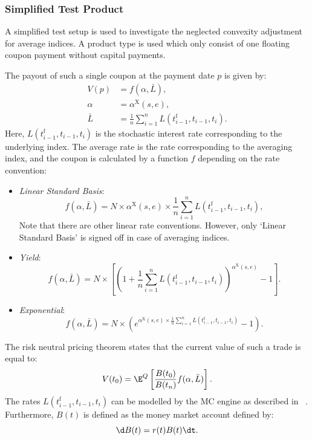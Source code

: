 \documentclass[]{pmv_report} %
\begin{document}
\subsubsection*{Simplified Test Product}
A simplified test setup is used to investigate the neglected convexity adjustment for average indices.
A product type is used which only consist of one floating coupon payment without capital payments.

The payout of such a single coupon at the payment date $p$ is given by:
\begin{align}
  V(p)   & =  f(\alpha, \bar{L}), \label{eq:payoutSingleCoupon1} \\
  \alpha & = \alpha^\text{X}(s,e), \label{eq:payoutSingleCoupon2} \\
  \bar{L} & =  \frac{1}{n} \sum_{i=1}^n L(t_{i-1}^\text{f}, t_{i-1}, t_i). \label{eq:payoutSingleCoupon3}
\end{align}
Here, $L(t_{i-1}^\text{f},t_{i-1}, t_i)$ is the stochastic interest rate corresponding to the underlying index.
The average rate is the rate corresponding to the averaging index, and the coupon is calculated by a function $f$ depending on the rate convention:
\begin{itemize}
 \item \textit{Linear Standard Basis}:
 \begin{equation*}
   f(\alpha, \bar{L})  = N \times \alpha^\text{X}(s,e) \times \frac{1}{n} \sum_{i=1}^n L(t_{i-1}^\text{f}, t_{i-1}, t_i),
 \end{equation*}
 Note that there are other linear rate conventions. However, only `Linear Standard Basis' is signed off in case of averaging indices.
\item \textit{Yield}:
    \begin{equation*}
          f(\alpha, \bar{L})  = N \times \left[ \left( 1 + \frac{1}{n} \sum_{i=1}^n L(t_{i-1}^\text{f},t_{i-1}, t_i) \right)^{\alpha^\text{X}(s,e)} - 1 \right].
    \end{equation*}
\item \textit{Exponential}:
    \begin{equation*}
          f(\alpha, \bar{L})  = N \times \left( e^{\alpha^\text{X}(s,e) \times \frac{1}{n} \sum_{i=1}^n L(t_{i-1}^\text{f},t_{i-1}, t_i)} - 1 \right).
    \end{equation*}
\end{itemize}

The risk neutral pricing theorem states that the current value of such a trade is equal to:
\begin{equation}
  V(t_0) = \E^Q\left[ \frac{B(t_0)}{B(t_n)} f(\alpha, \bar{L}) \right].
\end{equation}
The rates $L(t_{i-1}^\text{f}, t_{i-1}, t_i)$ can be modelled by the MC engine as described in~\cite{Mx.XVAFramework} .
Furthermore, $B(t)$ is defined as the money market account defined by:
\begin{equation}
 \d B(t)=r(t)B(t)\dt.
\end{equation}
\end{document}
